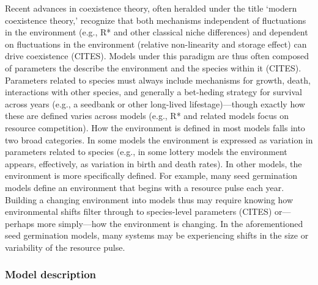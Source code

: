 \documentclass[11pt,letterpaper]{article}
\begin{document}
Recent advances in coexistence theory, often heralded under the title `modern coexistence theory,' recognize that both mechanisms independent of fluctuations in the environment (e.g., R* and other classical niche differences) and dependent on fluctuations in the environment (relative non-linearity and storage effect) can drive coexistence (CITES). Models under this paradigm are thus often composed of parameters the describe the environment and the species within it (CITES). Parameters related to species must always include mechanisms for growth, death, interactions with other species, and generally a bet-heding strategy for survival across years (e.g., a seedbank or other long-lived lifestage)---though exactly how these are defined varies across models (e.g., R* and related models focus on resource competition). How the environment is defined in most models falls into two broad categories. In some models the environment is expressed as variation in parameters related to species (e.g., in some lottery models the environment appears, effectively, as variation in birth and death rates). In other models, the environment is more specifically defined. For example, many seed germination models define an environment that begins with a resource pulse each year. Building a changing environment into models thus may require knowing how environmental shifts filter through to species-level parameters (CITES) or---perhaps more simply---how the environment is changing. In the aforementioned seed germination models, many systems may be experiencing shifts in the size or variability of the resource pulse.\\

\subsubsection{Model description}
\end{document}
